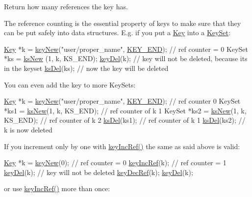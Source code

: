 Return how many references the key has.

The reference counting is the essential property of keys to make sure that they can be put safely into data structures. E.\-g. if you put a \hyperlink{classkdb_1_1Key}{Key} into a \hyperlink{classkdb_1_1KeySet}{Key\-Set}\-:


\begin{DoxyCodeInclude}
\hyperlink{classkdb_1_1Key_a5679f5cae63caddd64a60388b9cc77fa}{Key} *k = \hyperlink{group__key_gad23c65b44bf48d773759e1f9a4d43b89}{keyNew}(\textcolor{stringliteral}{"user/proper\_name"}, \hyperlink{group__key_gga91fb3178848bd682000958089abbaf40aa8adb6fcb92dec58fb19410eacfdd403}{KEY\_END}); \textcolor{comment}{// ref counter =
       0}
KeySet *ks = \hyperlink{group__keyset_ga671e1aaee3ae9dc13b4834a4ddbd2c3c}{ksNew} (1, k, KS\_END);
\hyperlink{group__key_ga3df95bbc2494e3e6703ece5639be5bb1}{keyDel}(k); \textcolor{comment}{// key will not be deleted, because its in the keyset}
\hyperlink{group__keyset_ga27e5c16473b02a422238c8d970db7ac8}{ksDel}(ks); \textcolor{comment}{// now the key will be deleted}
\end{DoxyCodeInclude}
 You can even add the key to more Key\-Sets\-:


\begin{DoxyCodeInclude}
\hyperlink{classkdb_1_1Key_a5679f5cae63caddd64a60388b9cc77fa}{Key} *k = \hyperlink{group__key_gad23c65b44bf48d773759e1f9a4d43b89}{keyNew}(\textcolor{stringliteral}{"user/proper\_name"}, \hyperlink{group__key_gga91fb3178848bd682000958089abbaf40aa8adb6fcb92dec58fb19410eacfdd403}{KEY\_END}); \textcolor{comment}{// ref counter 0}
KeySet *ks1 = \hyperlink{group__keyset_ga671e1aaee3ae9dc13b4834a4ddbd2c3c}{ksNew}(1, k, KS\_END); \textcolor{comment}{// ref counter of k 1}
KeySet *ks2 = \hyperlink{group__keyset_ga671e1aaee3ae9dc13b4834a4ddbd2c3c}{ksNew}(1, k, KS\_END); \textcolor{comment}{// ref counter of k 2}
\hyperlink{group__keyset_ga27e5c16473b02a422238c8d970db7ac8}{ksDel}(ks1); \textcolor{comment}{// ref counter of k 1}
\hyperlink{group__keyset_ga27e5c16473b02a422238c8d970db7ac8}{ksDel}(ks2); \textcolor{comment}{// k is now deleted}
\end{DoxyCodeInclude}
 If you increment only by one with \hyperlink{group__key_ga6970a6f254d67af7e39f8e469bb162f1}{key\-Inc\-Ref()} the same as said above is valid\-:


\begin{DoxyCodeInclude}
\hyperlink{classkdb_1_1Key_a5679f5cae63caddd64a60388b9cc77fa}{Key} *k = \hyperlink{group__key_gad23c65b44bf48d773759e1f9a4d43b89}{keyNew}(0); \textcolor{comment}{// ref counter = 0}
\hyperlink{group__key_ga6970a6f254d67af7e39f8e469bb162f1}{keyIncRef}(k); \textcolor{comment}{// ref counter = 1}
\hyperlink{group__key_ga3df95bbc2494e3e6703ece5639be5bb1}{keyDel}(k); \textcolor{comment}{// key will not be deleted}
\hyperlink{group__key_ga2c6433ca22109e4e141946057eccb283}{keyDecRef}(k);
\hyperlink{group__key_ga3df95bbc2494e3e6703ece5639be5bb1}{keyDel}(k);
\end{DoxyCodeInclude}
 or use \hyperlink{group__key_ga6970a6f254d67af7e39f8e469bb162f1}{key\-Inc\-Ref()} more than once\-:


